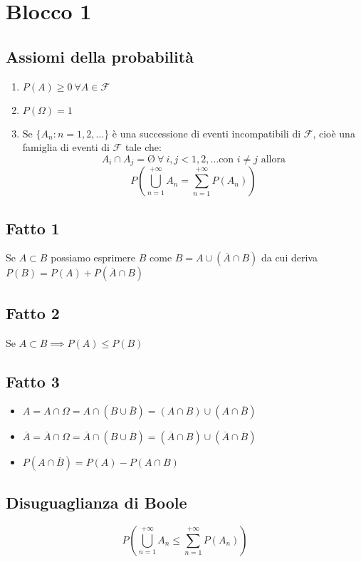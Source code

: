\section*{Blocco 1}
\subsection*{Assiomi della probabilità}
\begin{enumerate}
    \item $P(A) \ge 0 \ \forall A \in \mathscr{F}$
    \item $P(\Omega) = 1$
    \item Se $\{A_n: n = 1,2,\dots\}$ è una successione di eventi
    incompatibili di $\mathscr{F}$, cioè una famiglia di eventi di $\mathscr{F}$ tale che:
    $$A_i \cap A_j = \text{\O} \ \forall \ i,j < 1,2,\dots \text{con } i \neq j \text{ allora}$$
    $$P \left(\bigcup^{+\infty}_{n=1} A_n = \sum_{n=1}^{+\infty}P(A_n)\right)$$
\end{enumerate}

\subsection*{Fatto 1}
Se $A \subset B$ possiamo esprimere $B$ come $B = A\cup (\overline{A} \cap B)$ 
da cui deriva $P(B) = P(A) + P(\overline{A} \cap B)$

\subsection*{Fatto 2}
Se $A \subset B \implies P(A) \le P(B)$

\subsection*{Fatto 3}
\begin{itemize}
    \item $A = A \cap \Omega = A \cap (B \cup \overline{B}) = (A \cap B) \cup (A \cap \overline{B})$
    \item $\overline{A} = \overline{A} \cap \Omega = \overline{A} \cap (B \cup \overline{B}) = (\overline{A} \cap B) \cup (\overline{A} \cap \overline{B})$
    \item $P(A \cap \overline{B}) = P(A) - P(A \cap B)$
\end{itemize}

\subsection*{Disuguaglianza di Boole}
$$P \left(\bigcup^{+\infty}_{n=1} A_n \le \sum_{n=1}^{+\infty}P(A_n)\right)$$

